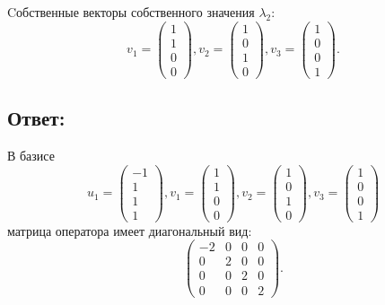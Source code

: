 \documentclass[12pt]{article}
\begin{document}
    Cобственные векторы собственного значения $\lambda_2$:
    \[
        v_1 = \begin{pmatrix}
                  1 \\ 1 \\ 0 \\ 0
        \end{pmatrix},
        v_2 = \begin{pmatrix}
                  1 \\ 0 \\ 1 \\ 0
        \end{pmatrix},
        v_3 = \begin{pmatrix}
                  1 \\ 0 \\ 0 \\ 1
        \end{pmatrix}.
    \]

    \subsection*{Ответ:}
    В базисе
    \[
        u_1 = \begin{pmatrix}
                  -1 \\ 1 \\ 1 \\ 1
        \end{pmatrix},
        v_1 = \begin{pmatrix}
                  1 \\ 1 \\ 0 \\ 0
        \end{pmatrix},
        v_2 = \begin{pmatrix}
                  1 \\ 0 \\ 1 \\ 0
        \end{pmatrix},
        v_3 = \begin{pmatrix}
                  1 \\ 0 \\ 0 \\ 1
        \end{pmatrix}
    \]
    матрица оператора имеет диагональный вид:
    \[
        \begin{pmatrix}
            -2 & 0 & 0 & 0 \\
            0  & 2 & 0 & 0 \\
            0  & 0 & 2 & 0 \\
            0  & 0 & 0 & 2
        \end{pmatrix}
        .
    \]
\end{document}

